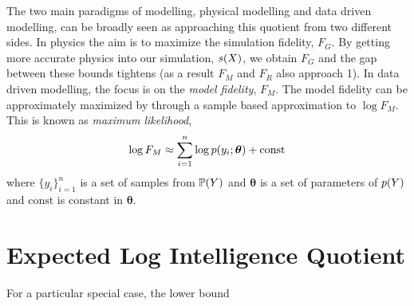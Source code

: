 \documentclass[]{article}
\begin{document}
The two main paradigms of modelling, physical modelling and data driven modelling, can be broadly seen as approaching this quotient from two different sides. In physics the aim is to maximize the simulation fidelity, $F_G$. By getting more accurate physics into our simulation, $s(X)$, we obtain $F_G$ and the gap between these bounds tightens (as a result $F_M$ and $F_R$ also approach 1). In data driven modelling, the focus is on the \emph{model fidelity}, $F_M$. The model fidelity can be approximately maximized by through a sample based approximation to $\log F_M$. This is known as \emph{maximum likelihood},
\[
\log F_M \approx \sum_{i=1}^n \log p(y_i; \boldsymbol{\theta}) + \text{const}
\]
where $\{y_i\}_{i=1}^n$ is a set of samples from $\mathbb{P}(Y)$ and $\boldsymbol{\theta}$ is a set of parameters of $p(Y)$ and $\text{const}$ is constant in $\boldsymbol{\theta}$.

\section{Expected Log Intelligence Quotient}

For a particular special case, the lower bound 
\end{document}
